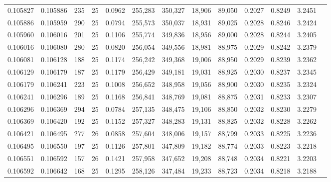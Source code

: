 \begin{tabular}{rrrrrrrrrrrrr}
0.105827 & 0.105886 &   235 &  25 &                                     0.0962 & 255,283 & 350,327 &  18,906 &  89,050 & 0.2027 & 0.8249 & 3.2451 \\
0.105886 & 0.105959 &   290 &  25 &                                     0.0794 & 255,573 & 350,037 &  18,931 &  89,025 & 0.2028 & 0.8246 & 3.2424 \\
0.105960 & 0.106016 &   201 &  25 &                                     0.1106 & 255,774 & 349,836 &  18,956 &  89,000 & 0.2028 & 0.8244 & 3.2405 \\
0.106016 & 0.106080 &   280 &  25 &                                     0.0820 & 256,054 & 349,556 &  18,981 &  88,975 & 0.2029 & 0.8242 & 3.2379 \\
0.106081 & 0.106128 &   188 &  25 &                                     0.1174 & 256,242 & 349,368 &  19,006 &  88,950 & 0.2029 & 0.8239 & 3.2362 \\
0.106129 & 0.106179 &   187 &  25 &                                     0.1179 & 256,429 & 349,181 &  19,031 &  88,925 & 0.2030 & 0.8237 & 3.2345 \\
0.106179 & 0.106241 &   223 &  25 &                                     0.1008 & 256,652 & 348,958 &  19,056 &  88,900 & 0.2030 & 0.8235 & 3.2324 \\
0.106241 & 0.106296 &   189 &  25 &                                     0.1168 & 256,841 & 348,769 &  19,081 &  88,875 & 0.2031 & 0.8233 & 3.2307 \\
0.106296 & 0.106369 &   294 &  25 &                                     0.0784 & 257,135 & 348,475 &  19,106 &  88,850 & 0.2032 & 0.8230 & 3.2279 \\
0.106369 & 0.106420 &   192 &  25 &                                     0.1152 & 257,327 & 348,283 &  19,131 &  88,825 & 0.2032 & 0.8228 & 3.2262 \\
0.106421 & 0.106495 &   277 &  26 &                                     0.0858 & 257,604 & 348,006 &  19,157 &  88,799 & 0.2033 & 0.8225 & 3.2236 \\
0.106495 & 0.106550 &   197 &  25 &                                     0.1126 & 257,801 & 347,809 &  19,182 &  88,774 & 0.2033 & 0.8223 & 3.2218 \\
0.106551 & 0.106592 &   157 &  26 &                                     0.1421 & 257,958 & 347,652 &  19,208 &  88,748 & 0.2034 & 0.8221 & 3.2203 \\
0.106592 & 0.106642 &   168 &  25 &                                     0.1295 & 258,126 & 347,484 &  19,233 &  88,723 & 0.2034 & 0.8218 & 3.2188 \\

\end{tabular}
